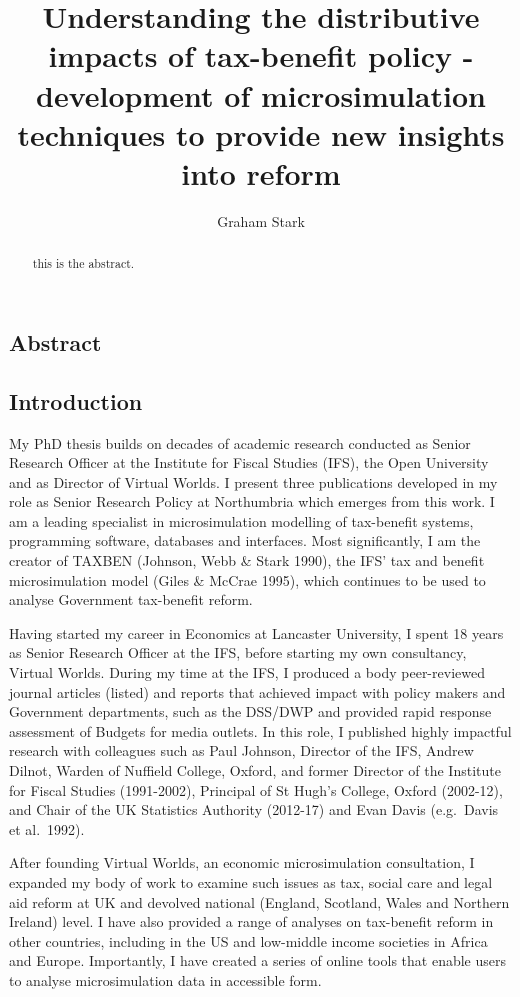 \documentclass[
  letterpaper,
  DIV=11,
  numbers=noendperiod]{scrartcl}
\title{Understanding the distributive impacts of tax-benefit policy -
development of microsimulation techniques to provide new insights into
reform}
\author{Graham Stark}
\date{}
\begin{document}
\maketitle
\begin{abstract}
this is the abstract.
\end{abstract}

\subsection{Abstract}\label{abstract}

\subsection{Introduction}\label{introduction}

My PhD thesis builds on decades of academic research conducted as Senior
Research Officer at the Institute for Fiscal Studies (IFS), the Open
University and as Director of Virtual Worlds. I present three
publications developed in my role as Senior Research Policy at
Northumbria which emerges from this work. I am a leading specialist in
microsimulation modelling of tax-benefit systems, programming software,
databases and interfaces. Most significantly, I am the creator of TAXBEN
(Johnson, Webb \& Stark 1990), the IFS' tax and benefit microsimulation
model (Giles \& McCrae 1995), which continues to be used to analyse
Government tax-benefit reform.

Having started my career in Economics at Lancaster University, I spent
18 years as Senior Research Officer at the IFS, before starting my own
consultancy, Virtual Worlds. During my time at the IFS, I produced a
body peer-reviewed journal articles (listed) and reports that achieved
impact with policy makers and Government departments, such as the
DSS/DWP and provided rapid response assessment of Budgets for media
outlets. In this role, I published highly impactful research with
colleagues such as Paul Johnson, Director of the IFS, Andrew Dilnot,
Warden of Nuffield College, Oxford, and former Director of the Institute
for Fiscal Studies (1991-2002), Principal of St Hugh's College, Oxford
(2002-12), and Chair of the UK Statistics Authority (2012-17) and Evan
Davis (e.g.~Davis et al.~1992).

After founding Virtual Worlds, an economic microsimulation consultation,
I expanded my body of work to examine such issues as tax, social care
and legal aid reform at UK and devolved national (England, Scotland,
Wales and Northern Ireland) level. I have also provided a range of
analyses on tax-benefit reform in other countries, including in the US
and low-middle income societies in Africa and Europe. Importantly, I
have created a series of online tools that enable users to analyse
microsimulation data in accessible form.
\end{document}
